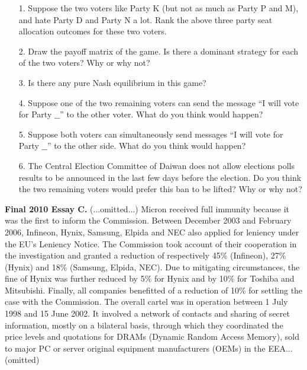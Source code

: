 \documentclass[12pt, xcolor=dvipsnames]{beamer}
\begin{document}
\begin{frame}
\small
\begin{enumerate}\itemsep-0.5ex 
\item[1.] Suppose the two voters like Party K (but not as much as Party P and M), and hate Party D and Party N a lot. Rank the above three party seat allocation outcomes for these two voters.
\item[2.] Draw the payoff matrix of the game. Is there a dominant strategy for each of the two voters? Why or why not?
\item[3.] Is there any pure Nash equilibrium in this game?
\item[4.] Suppose one of the two remaining voters can send the message ``I will vote for Party $\_\_$'' to the other voter. What do you think would happen?
\item[5.] Suppose both voters can simultaneously send messages ``I will vote for Party $\_\_$'' to the other side. What do you think would happen?
\item[6.] The Central Election Committee of Daiwan does not allow elections polls results to be announced in the last few days before the election. Do you think the two remaining voters would prefer this ban to be lifted? Why or why not? 
\end{enumerate}
\end{frame}



\begin{frame}
\small \textsf{\bfseries Final 2010 Essay C. } (...omitted...)
Micron received full immunity because it was the first to inform the Commission. Between December 2003 and February 2006, Infineon, Hynix, Samsung, Elpida and NEC also applied for leniency under the EU's Leniency Notice. The Commission took account of their cooperation in  the investigation and granted a reduction of respectively 45\% (Infineon), 27\% (Hynix) and 18\% (Samsung, Elpida, NEC). Due to mitigating circumstances, the fine of Hynix was further reduced by 5\% for Hynix and by 10\% for Toshiba and Mitsubishi. Finally, all companies benefitted of a reduction of 10\% for settling the case with the Commission. The overall cartel was in operation between 1 July 1998 and 15 June 2002. It involved a network of contacts and sharing of secret information, mostly on a bilateral basis, through which they coordinated the price levels and quotations for DRAMs (Dynamic Random Access Memory), sold to major PC or server original equipment manufacturers (OEMs) in the EEA... (omitted)\end{frame}
\end{document}
